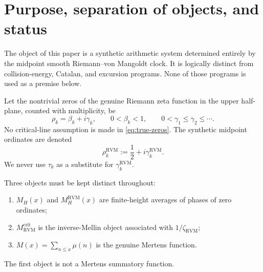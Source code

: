 \documentclass[11pt,reqno]{amsart}
\theoremstyle{definition}
\theoremstyle{remark}
\newcommand{\RVM}{\mathrm{RVM}}
\newcommand{\crit}{\mathrm{crit}}
\begin{document}
\tableofcontents

\section{Purpose, separation of objects, and status}

The object of this paper is a synthetic arithmetic system determined entirely by the midpoint smooth Riemann--von Mangoldt clock.  It is logically distinct from collision-energy, Catalan, and excursion programs.  None of those programs is used as a premise below.

Let the nontrivial zeros of the genuine Riemann zeta function in the upper half-plane, counted with multiplicity, be
\begin{equation}\label{eq:true-zeros}
 \rho_k=\beta_k+i\gamma_k,
 \qquad 0<\beta_k<1,
 \qquad 0<\gamma_1\le\gamma_2\le\cdots .
\end{equation}
No critical-line assumption is made in \eqref{eq:true-zeros}.  The synthetic midpoint ordinates are denoted
\begin{equation}\label{eq:synthetic-zero-notation}
 \rho_k^{\RVM}:=\frac12+i\gamma_k^{\RVM}.
\end{equation}
We never use $\tau_k$ as a substitute for $\gamma_k^{\RVM}$.

Three objects must be kept distinct throughout:
\begin{enumerate}[label=\textup{(\roman*)}]
\item $M_H(x)$ and $M_H^{\RVM}(x)$ are finite-height averages of phases of zero ordinates;
\item $M_{\RVM}^{\crit}$ is the inverse-Mellin object associated with $1/\zeta_{\RVM}$;
\item $M(x)=\sum_{n\le x}\mu(n)$ is the genuine Mertens function.
\end{enumerate}
The first object is not a Mertens summatory function.
\end{document}
